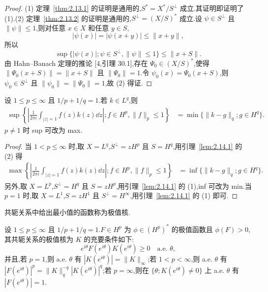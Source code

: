 \begin{proof}
(1) 定理~\ref{thm:2.13.1} 的证明是通用的,$S^{*} = X^{*}/S^{\perp}$ 成立.其证明即证明了 (1).(2) 定理~\ref{thm:2.13.2} 的证明是通用的,$S^{\perp} = (X/S)^{*}$ 成立.设 $\psi \in S^{\perp}$ 且 $\|\psi\| \leq 1$,则对任意 $x \in X$ 和任意 $y \in S$,
\begin{equation*}
|\psi(x)| = |\psi(x + y)| \leq \|x + y\|,
\end{equation*}
所以
\begin{equation*}
\sup \{|\psi(x)|; \psi \in S^{\perp}, \|\psi\| \leq 1\} \leq \|x + S\|.
\end{equation*}
由 Hahn--Banach 定理的推论 [4,引理 30.1],存在 $\Psi_{0} \in (X/S)^{*}$,使得 $\|\Psi_{0}(x+S)\| = \|x+S\|$ 且 $\|\Psi_{0}\| = 1$.令 $\psi_{0}(x) = \Psi_{0}(x+S)$,则 $\psi_{0} \in S^{\perp}$ 且 $\|\psi_{0}\| = \|\Psi_{0}\| = 1$,故 (2) 得证.
\end{proof}

\begin{theorem}\label{thm:2.14.2}
设 $1 \leq p \leq \infty$ 且 $1/p + 1/q = 1$.若 $k \in L^{q}$,则
\begin{align*}
\sup \left\{\left| \frac{1}{2\pi i}\int_{|z|=1} f(z) k(z)\dd z \right|; f \in H^{p}, \|f\|_{p} \leq 1 \right\}&= \min \{\|k - g\|_{q}; g \in H^{q}\}.
 \end{align*}
$p \neq 1$ 时 sup 可改为 max.
\end{theorem}

\begin{proof}
当 $1 < p \leq \infty$ 时,取 $X = L^{q}$,$S^{\perp} = zH^{p}$ 且 $S = H^{q}$,用引理~\ref{lem:2.14.1} 的 (2) 得
\begin{align*}
\max \left\{\left| \frac{1}{2\pi i}\int_{|z|=1} f(z) k(z)\dd z \right|; f \in H^{p}, \|f\|_{p} \leq 1 \right\}&= \inf \{\|k - g\|_{q}; g \in H^{q}\}.
 \end{align*}
另外,取 $X = L^{p}$,$S^{\perp} = H^{q}$ 且 $S = zH^{p}$,用引理~\ref{lem:2.14.1} 的 (1),inf 可改为 min.当 $p = 1$ 时,取 $X = L^{1}$,$S = zH^{1}$ 且 $S^{\perp} = H^{\infty}$,用引理~\ref{lem:2.14.1} 的 (1) 即可.
\end{proof}

共轭关系中给出最小值的函数称为极值核.

\begin{lemma}\label{lem:2.14.3}
设 $1 \leq p \leq \infty$ 且 $1/p + 1/q = 1$.$F \in H^{p}$ 为 $\phi \in (H^{p})^{*}$ 的极值函数且 $\phi(F) > 0$,其共轭关系的极值核为 $K$ 的充要条件如下:
\begin{equation*}
e^{i\theta} F(e^{i\theta}) K(e^{i\theta}) \geq 0 \quad \text{a.e. } \theta,
\end{equation*}
并且,若 $p = 1$,则 a.e. $\theta$ 有 $|K(e^{i\theta})| = \|K\|_{\infty}$;若 $1 < p < \infty$,则 a.e. $\theta$ 有 $|F(e^{i\theta})|^{p} = \|K\|_{q}^{-q}|K(e^{i\theta})|^{q}$;若 $p = \infty$,则在 $\{\theta; K(e^{i\theta}) \neq 0\}$ 上 a.e. $\theta$ 有 $|F(e^{i\theta})| = 1$.
\end{lemma}

